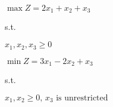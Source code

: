 \begin{frameExample}{}

  $\max Z = 2x_1 + x_2 + x_3$

  s.t.


  $x_1, x_2, x_3 \geq 0$

  
\end{frameExample}

\begin{frameExample}{}

  $\min Z = 3x_1 - 2x_2 + x_3$

  s.t.


  $x_1, x_2\geq 0, \, x_3 \text{  is unrestricted} $

  
\end{frameExample}


